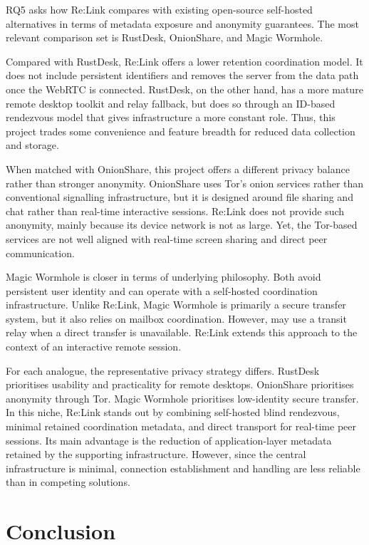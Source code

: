 \documentclass[12pt,a4paper]{article}
\begin{document}
RQ5 asks how Re:Link compares with existing open-source self-hosted alternatives in terms of metadata exposure and anonymity guarantees. The most relevant comparison set is RustDesk, OnionShare, and Magic Wormhole.

Compared with RustDesk, Re:Link offers a lower retention coordination model. It does not include persistent identifiers and removes the server from the data path once the WebRTC is connected. RustDesk, on the other hand, has a more mature remote desktop toolkit and relay fallback, but does so through an ID-based rendezvous model that gives infrastructure a more constant role. Thus, this project trades some convenience and feature breadth for reduced data collection and storage.

When matched with OnionShare, this project offers a different privacy balance rather than stronger anonymity. OnionShare uses Tor’s onion services rather than conventional signalling infrastructure, but it is designed around file sharing and chat rather than real-time interactive sessions. Re:Link does not provide such anonymity, mainly because its device network is not as large. Yet, the Tor-based services are not well aligned with real-time screen sharing and direct peer communication.

Magic Wormhole is closer in terms of underlying philosophy. Both avoid persistent user identity and can operate with a self-hosted coordination infrastructure. Unlike Re:Link, Magic Wormhole is primarily a secure transfer system, but it also relies on mailbox coordination. However, may use a transit relay when a direct transfer is unavailable. Re:Link extends this approach to the context of an interactive remote session.

For each analogue, the representative privacy strategy differs. RustDesk prioritises usability and practicality for remote desktops. OnionShare prioritises anonymity through Tor. Magic Wormhole prioritises low-identity secure transfer. In this niche, Re:Link stands out by combining self-hosted blind rendezvous, minimal retained coordination metadata, and direct transport for real-time peer sessions. Its main advantage is the reduction of application-layer metadata retained by the supporting infrastructure. However, since the central infrastructure is minimal, connection establishment and handling are less reliable than in competing solutions.

\section{Conclusion}
\end{document}
